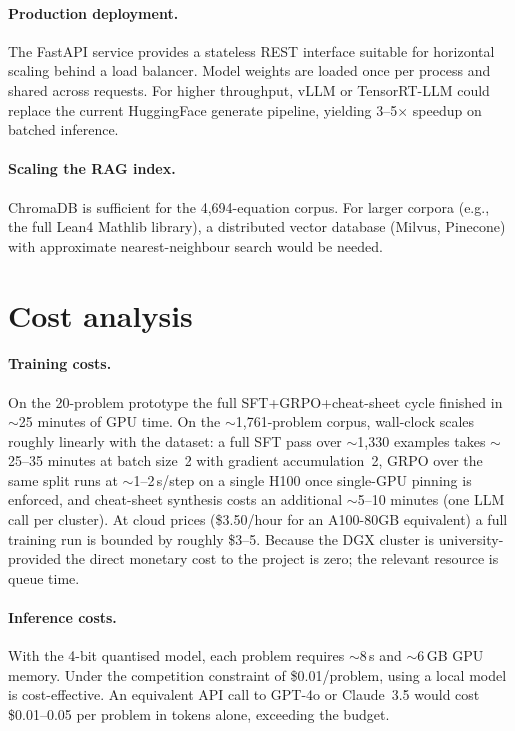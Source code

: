 \documentclass{article}
\begin{document}
\paragraph{Production deployment.} The FastAPI service provides a stateless REST interface suitable for horizontal scaling behind a load balancer. Model weights are loaded once per process and shared across requests. For higher throughput, vLLM or TensorRT-LLM could replace the current HuggingFace generate pipeline, yielding 3--5$\times$ speedup on batched inference.

\paragraph{Scaling the RAG index.} ChromaDB is sufficient for the 4,694-equation corpus. For larger corpora (e.g., the full Lean4 Mathlib library), a distributed vector database (Milvus, Pinecone) with approximate nearest-neighbour search would be needed.

\section{Cost analysis}
\label{sec:cost}

\paragraph{Training costs.} On the 20-problem prototype the full SFT+GRPO+cheat-sheet cycle finished in $\sim$25 minutes of GPU time. On the $\sim$1{,}761-problem corpus, wall-clock scales roughly linearly with the dataset: a full SFT pass over $\sim$1{,}330 examples takes $\sim$25--35 minutes at batch size~2 with gradient accumulation~2, GRPO over the same split runs at $\sim$1--2\,s/step on a single H100 once single-GPU pinning is enforced, and cheat-sheet synthesis costs an additional $\sim$5--10 minutes (one LLM call per cluster). At cloud prices (\$3.50/hour for an A100-80GB equivalent) a full training run is bounded by roughly \$3--5. Because the DGX cluster is university-provided the direct monetary cost to the project is zero; the relevant resource is queue time.

\paragraph{Inference costs.} With the 4-bit quantised model, each problem requires $\sim$8\,s and $\sim$6\,GB GPU memory. Under the competition constraint of \$0.01/problem, using a local model is cost-effective. An equivalent API call to GPT-4o or Claude~3.5 would cost \$0.01--0.05 per problem in tokens alone, exceeding the budget.
\end{document}
